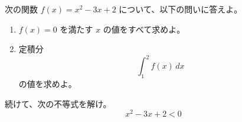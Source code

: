 \documentclass[paper=a4]{jlreq}
\begin{document}

次の関数 $f(x) = x^2 - 3x + 2$ について、以下の問いに答えよ。

\begin{enumerate}
  \item $f(x) = 0$ を満たす $x$ の値をすべて求めよ。
  \item 定積分
    \[
      \int_{1}^{2} f(x)\,dx
    \]
    の値を求めよ。
\end{enumerate}

\newpage

続けて、次の不等式を解け。
\[
  x^2 - 3x + 2 < 0
\]
\end{document}
